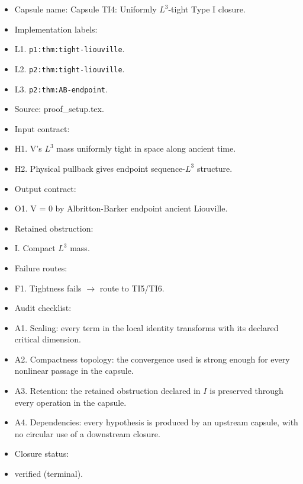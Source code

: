 \documentclass[11pt]{amsart}
\begin{document}
\begin{itemize}
  \item Capsule name: Capsule TI4: Uniformly $L^3$-tight Type I closure.
  \item Implementation labels:
  \item L1. \texttt{p1:thm:tight-liouville}.
  \item L2. \texttt{p2:thm:tight-liouville}.
  \item L3. \texttt{p2:thm:AB-endpoint}.
  \item Source: proof\_setup.tex.
  \item Input contract:
  \item H1. V's $L^3$ mass uniformly tight in space along ancient time.
  \item H2. Physical pullback gives endpoint sequence-$L^3$ structure.
  \item Output contract:
  \item O1. V = 0 by Albritton-Barker endpoint ancient Liouville.
  \item Retained obstruction:
  \item I. Compact $L^3$ mass.
  \item Failure routes:
  \item F1. Tightness fails $\to$ route to TI5/TI6.
  \item Audit checklist:
  \item A1. Scaling: every term in the local identity transforms with its declared critical dimension.
  \item A2. Compactness topology: the convergence used is strong enough for every nonlinear passage in the capsule.
  \item A3. Retention: the retained obstruction declared in $I$ is preserved through every operation in the capsule.
  \item A4. Dependencies: every hypothesis is produced by an upstream capsule, with no circular use of a downstream closure.
  \item Closure status:
  \item verified (terminal).
\end{itemize}
\end{document}
